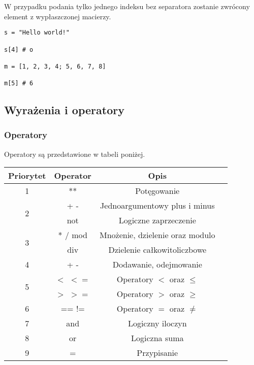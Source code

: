 \documentclass[12pt,a4paper]{article}
\begin{document}
W przypadku podania tylko jednego indeksu bez separatora zostanie zwrócony element z wypłaszczonej macierzy.

\begin{lstlisting}
s = "Hello world!"

s[4] # o

m = [1, 2, 3, 4; 5, 6, 7, 8]

m[5] # 6
\end{lstlisting}

\pagebreak

\subsection{Wyrażenia i operatory}

\subsubsection{Operatory}
Operatory są przedstawione w tabeli poniżej.

\begin{table}[ht]
  \centering
  \begin{tabular}{ |c|c|c|c| }
    \hline
    \textbf{Priorytet} & \textbf{Operator} & \textbf{Opis} \\ [0.5ex] 
    \hline
    1 & ** & Potęgowanie \\
    \hline
    \multirow{2}{*}{2} & + - & Jednoargumentowy plus i minus \\
                       & not & Logiczne zaprzeczenie  \\
    \hline
    \multirow{2}{*}{3} & * / mod & Mnożenie, dzielenie oraz modulo \\
                       & div & Dzielenie całkowitoliczbowe \\
    \hline
    4 & + - & Dodawanie, odejmowanie \\ 
    \hline
    \multirow{2}{*}{5} & $<$ $<=$ & Operatory $<$ oraz $\leq$ \\
                       & $>$ $>=$ & Operatory $>$ oraz $\geq$ \\
    \hline
    6 & == != & Operatory $=$ oraz $\neq$ \\
    \hline
    7 & and & Logiczny iloczyn \\
    \hline
    8 & or & Logiczna suma \\
    \hline
    9 & = & Przypisanie \\
    \hline
  \end{tabular}
\end{table}
\end{document}
